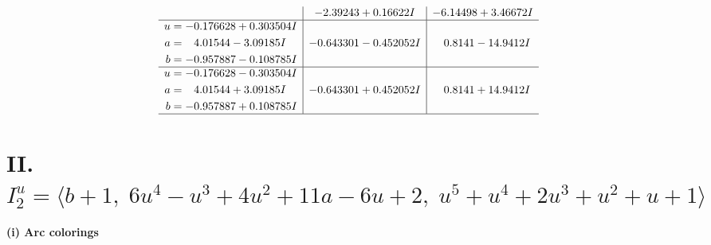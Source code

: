 \documentclass[1p]{elsarticle_modified}
\theoremstyle{definition}
\begin{document}
$$\begin{array}{c|c|c}
 & -2.39243 + 0.16622 I & -6.14498 + 3.46672 I \\ \hline\begin{aligned}
u &= -0.176628 + 0.303504 I \\
a &= \phantom{-}4.01544 - 3.09185 I \\
b &= -0.957887 - 0.108785 I\end{aligned}
 & -0.643301 - 0.452052 I & \phantom{-}0.8141 - 14.9412 I \\ \hline\begin{aligned}
u &= -0.176628 - 0.303504 I \\
a &= \phantom{-}4.01544 + 3.09185 I \\
b &= -0.957887 + 0.108785 I\end{aligned}
 & -0.643301 + 0.452052 I & \phantom{-}0.8141 + 14.9412 I\\
 \hline 
 \end{array}$$\newpage\newpage\renewcommand{\arraystretch}{1}
\centering \section*{II. $I^u_{2}= \langle b+1,\;6 u^4- u^3+4 u^2+11 a-6 u+2,\;u^5+u^4+2 u^3+u^2+u+1 \rangle$}
\flushleft \textbf{(i) Arc colorings}\\
\end{document}

